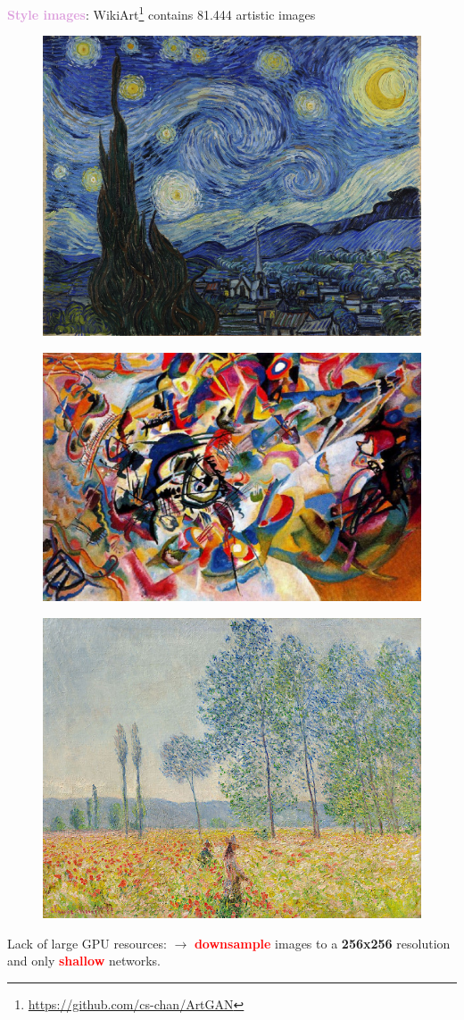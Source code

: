 \documentclass[11pt,xcolor=dvipsnames]{beamer}
\begin{document}
\begin{frame}
\begin{multicols*}{3}
\end{multicols*}



\textcolor{Plum}{\textbf{Style images}}: WikiArt\footnote{\url{https://github.com/cs-chan/ArtGAN}} contains 81.444 artistic images


\begin{multicols*}{3}

\begin{figure}
	\includegraphics[width=0.6\linewidth]{starry_night.jpg}
\end{figure}

\columnbreak

\begin{figure}
	\includegraphics[width=0.6 \linewidth]{kandinsky_composition.jpg}
\end{figure}

\columnbreak

\begin{figure}
	\includegraphics[width=0.6\linewidth]{monet.jpg}
\end{figure}

\end{multicols*}


Lack of large GPU resources: $\rightarrow$ \textcolor{red}{\textbf{downsample}} images to a \textbf{256x256} resolution and only \textcolor{red}{\textbf{shallow}} networks.

\end{frame}
\end{document}
